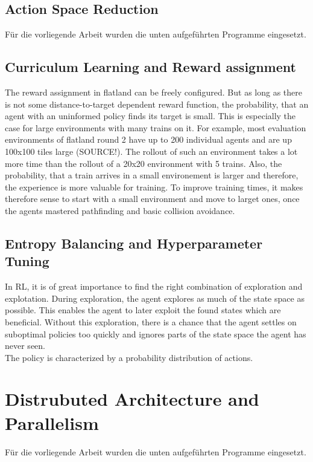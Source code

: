\subsection{Action Space Reduction}\label{reduced_action_space}
Für die vorliegende Arbeit wurden die unten aufgeführten Programme eingesetzt.


\subsection{Curriculum Learning and Reward assignment}\label{curriculum_learning}
The reward assignment in flatland can be freely configured. But as long as there is not some distance-to-target dependent reward function, the probability, that an agent with an uninformed policy finds its target is small. This is especially the case for large environments with many trains on it. For example, most evaluation environments of flatland round 2 have up to 200 individual agents and are up 100x100 tiles large (SOURCE!). The rollout of such an environment takes a lot more time than the rollout of a 20x20 environment with 5 trains. Also, the probability, that a train arrives in a small environement is larger and therefore, the experience is more valuable for training.
To improve training times, it makes therefore sense to start with a small environment and move to larget ones, once the agents mastered pathfinding and basic collision avoidance.

\subsection{Entropy Balancing and Hyperparameter Tuning}\label{enhanced_observations}
In RL, it is of great importance to find the right combination of exploration and explotation. During exploration, the agent explores as much of the state space as possible. This enables the agent to later exploit the found states which are beneficial. Without this exploration, there is a chance that the agent settles on suboptimal policies too quickly and ignores parts of the state space the agent has never seen.\\
The policy is characterized by a probability distribution of actions.


\section{Distrubuted Architecture and Parallelism}\label{dist_architecture}
Für die vorliegende Arbeit wurden die unten aufgeführten Programme eingesetzt.





